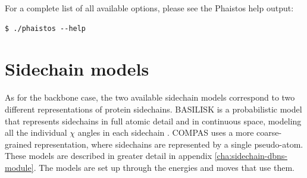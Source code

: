 \documentclass[11pt,a4paper,twoside]{book}
\begin{document}
\noindent
For a complete list of all available options, please see the Phaistos
help output:

\begin{verbatim}
$ ./phaistos --help
\end{verbatim}


\section{Sidechain models}
\label{sec:sidechain-models}

As for the backbone case, the two available sidechain models
correspond to two different representations of protein
sidechains. BASILISK is a probabilistic model that represents
sidechains in full atomic detail and in continuous space, modeling all
the individual $\chi$ angles in each sidechain
\cite{harder2010beyond}.  COMPAS uses a more coarse-grained
representation, where sidechains are represented by a single
pseudo-atom. These models are described in greater detail in appendix
\ref{cha:sidechain-dbns-module}. The models are set up through the
energies and moves that use them.




\appendix







\end{document}
